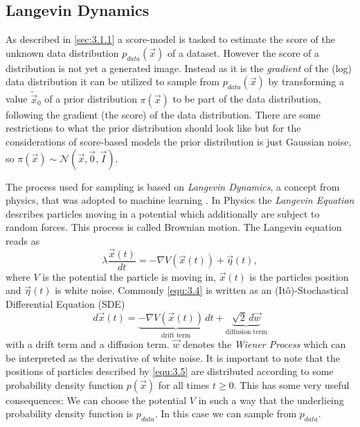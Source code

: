 \subsection{Langevin Dynamics} \label{sec:3.1.2}
As described in \cref{sec:3.1.1} a score-model is tasked to estimate the score of the unknown data distribution $p_{data}(\vec{x})$ of a dataset. However the score of a distribution is not yet a generated image. Instead as it is the \textit{gradient} of the (log) data distribution it can be utilized to sample from $p_{data}(\vec{x})$ by transforming a value $\tilde{\vec{x}}_0$ of a prior distribution $\pi(\vec{x})$ to be part of the data distribution, following the gradient (the score) of the data distribution. There are some restrictions to what the prior distribution should look like but for the considerations of score-based models the prior distribution is just Gaussian noise, so $\pi(\vec{x})\sim\mathcal{N}(\vec{x}, \vec{0}, \vec{I})$.

The process used for sampling is based on \textit{Langevin Dynamics}, a concept from physics, that was adopted to machine learning \cite{langevin1, langevin2}. In Physics the \textit{Langevin Equation} describes particles moving in a potential which additionally are subject to random forces. This process is called Brownian motion. The Langevin equation reads as 
%
\begin{equation} \label{equ:3.4}
    \lambda \frac{\vec{x}(t)}{dt}=-\nabla V(\vec{x}(t))+\vec{\eta}(t),
\end{equation}
%
where $V$ is the potential the particle is moving in, $\vec{x}(t)$ is the particles position and $\vec{\eta}(t)$ is white noise. Commonly \cref{equ:3.4} is written as an (Itô)-Stochastical Differential Equation (SDE)
%
\begin{equation} \label{equ:3.5}
    d\vec{x}(t)=\underbrace{-\nabla V(\vec{x}(t))\,dt}_\text{drift term}+\underbrace{\sqrt{2}\,d\vec{w}}_\text{diffusion term}
\end{equation}
%
with a drift term and a diffusion term. $\vec{w}$ denotes the \textit{Wiener Process} which can be interpreted as the derivative of white noise. It is important to note that the positions of particles described by \cref{equ:3.5} are distributed according to some probability density function $p(\vec{x})$ for all times $t\geq0$. This has some very useful consequences: We can choose the potential $V$ in such a way that the underlieing probability density function is $p_{data}$. In this case we can sample from $p_{data}$.


